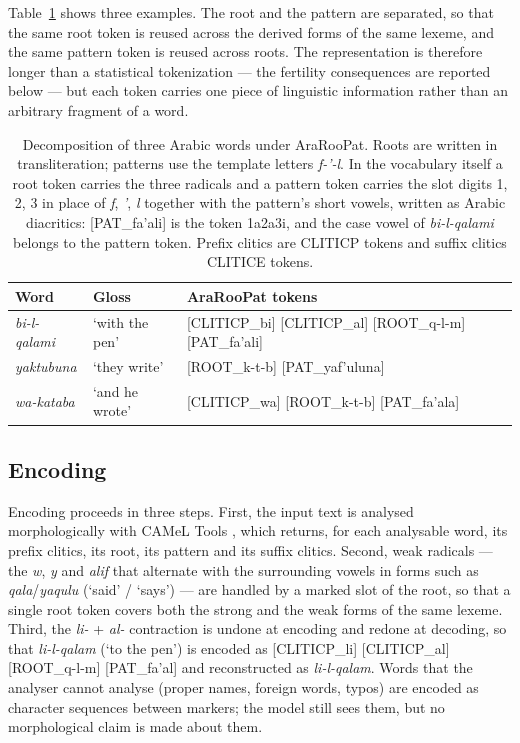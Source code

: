 \documentclass[a4paper,fleqn]{cas-sc}
\begin{document}
Table~\ref{tab:decomposition} shows three examples. The root and the pattern are separated, so that the same root token is reused across the derived forms of the same lexeme, and the same pattern token is reused across roots. The representation is therefore longer than a statistical tokenization --- the fertility consequences are reported below --- but each token carries one piece of linguistic information rather than an arbitrary fragment of a word.

\begin{table}[t]
\centering
\caption{Decomposition of three Arabic words under AraRooPat. Roots are written in transliteration; patterns use the template letters \emph{f-'-l}. In the vocabulary itself a root token carries the three radicals and a pattern token carries the slot digits 1, 2, 3 in place of \emph{f}, \emph{'}, \emph{l} together with the pattern's short vowels, written as Arabic diacritics: [PAT\_fa'ali] is the token 1a2a3i, and the case vowel of \emph{bi-l-qalami} belongs to the pattern token. Prefix clitics are CLITICP tokens and suffix clitics CLITICE tokens.}
\label{tab:decomposition}
\begin{tabular}{@{}lll@{}}
\toprule
Word & Gloss & AraRooPat tokens \\
\midrule
\emph{bi-l-qalami} & `with the pen' & [CLITICP\_bi] [CLITICP\_al] [ROOT\_q-l-m] [PAT\_fa'ali] \\
\emph{yaktubuna} & `they write' & [ROOT\_k-t-b] [PAT\_yaf'uluna] \\
\emph{wa-kataba} & `and he wrote' & [CLITICP\_wa] [ROOT\_k-t-b] [PAT\_fa'ala] \\
\bottomrule
\end{tabular}
\end{table}

\subsection{Encoding}
\label{sec:tokenizer:encoding}

Encoding proceeds in three steps. First, the input text is analysed morphologically with CAMeL Tools \citep{obeid2020camel}, which returns, for each analysable word, its prefix clitics, its root, its pattern and its suffix clitics. Second, weak radicals --- the \emph{w}, \emph{y} and \emph{alif} that alternate with the surrounding vowels in forms such as \emph{qala}/\emph{yaqulu} (`said' / `says') --- are handled by a marked slot of the root, so that a single root token covers both the strong and the weak forms of the same lexeme. Third, the \emph{li-} + \emph{al-} contraction is undone at encoding and redone at decoding, so that \emph{li-l-qalam} (`to the pen') is encoded as [CLITICP\_li] [CLITICP\_al] [ROOT\_q-l-m] [PAT\_fa'al] and reconstructed as \emph{li-l-qalam}. Words that the analyser cannot analyse (proper names, foreign words, typos) are encoded as character sequences between markers; the model still sees them, but no morphological claim is made about them.
\end{document}
